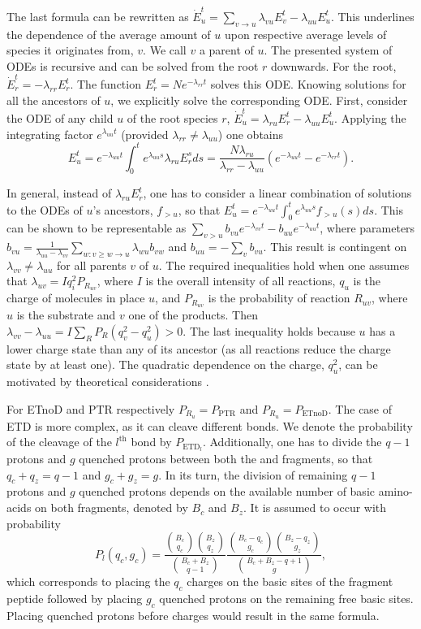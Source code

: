 \documentclass{llncs}
\begin{document}
The last formula can be rewritten as $ \dot E_u^t = \sum_{v\rightarrow u} \lambda_{vu} E_v^t - \lambda_{uu}E_u^t$.
This underlines the dependence of the average amount of $u$ upon respective average levels of species it originates from, $v$.
We call $v$ a parent of $u$.
The presented system of ODEs is recursive and can be solved from the root $r$ downwards.
For the root, $\dot E_r^t=-\lambda_{rr} E_r^t$.
The function $E_r^t= Ne^{-\lambda_{rr}t}$ solves this ODE.
Knowing solutions for all the ancestors of $u$, we explicitly solve the corresponding ODE.
First, consider the ODE of any child $u$ of the root species $r$, $\dot E_u^t= \lambda_{ru} E_r^t-\lambda_{uu} E_u^t$.
Applying the integrating factor $e^{\lambda_{uu}t}$ (provided $\lambda_{rr} \not= \lambda_{uu}$) one obtains
$$E_u^t=e^{-\lambda_{uu}t} \int_0^t e^{\lambda_{uu}s} \lambda_{ru} E_r^s ds = \frac{N \lambda_{ru}}{\lambda_{rr}-\lambda_{uu}}(e^{-\lambda_{uu}t}-e^{-\lambda_{rr}t}).$$

In general, instead of $\lambda_{ru} E_r^t$, one has to consider a linear combination of solutions to the ODEs of $u$'s ancestors, $f_{>u}$, so that $E_u^t=e^{-\lambda_{uu}t} \int_0^t e^{\lambda_{uu}s} f_{>u}(s)ds$.
This can be shown to be representable as $\sum_{v>u}b_{vu}e^{-\lambda_{vv}t}-b_{uu}e^{-\lambda_{uu}t}$, where parameters $b_{vu}= \frac{1}{\lambda_{uu}-\lambda_{vv}} \sum_{w: v\geq w \rightarrow u} \lambda_{wu}b_{vw}$ and $b_{uu}=-\sum_v b_{vu}$.
This result is contingent on $\lambda_{vv} \not= \lambda_{uu}$ for all parents $v$ of $u$.
The required inequalities hold when one assumes that $\lambda_{uv} = I q_i^2 P_{R_{uv}}$, where $I$ is the overall intensity of all reactions, $q_u$ is the charge of molecules in place $u$, and $P_{R_{uv}}$ is the probability of reaction $R_{uv}$, where $u$ is the substrate and $v$ one of the products. Then $\lambda_{vv} - \lambda_{uu} = I \sum_{R} P_R (q_v^2  - q_u^2) > 0.$
The last inequality holds because $u$ has a lower charge state than any of its ancestor
(as all reactions reduce the charge state by at least one).
The quadratic dependence on the charge, $q_u^2$, can be motivated by theoretical considerations \cite{McLuckey1999-su}.

For ETnoD and PTR respectively $P_{R_u}=P_\text{PTR}$ and $P_{R_u}=P_\text{ETnoD}$.
The case of ETD is more complex, as it can cleave different bonds.
We denote the probability of the cleavage of the $l^\text{th}$ bond by $P_{\text{ETD}_l}$.
Additionally, one has to divide the $q-1$ protons and $g$ quenched protons between both the  and  fragments, so that $q_c+q_z=q-1$ and $g_c+g_z = g$.
In its turn, the division of remaining $q-1$ protons and $g$ quenched protons depends on the available number of basic amino-acids on both fragments, denoted by $B_c$ and $B_z$.
It is assumed to occur with probability
$$P_l(q_c, g_c) = \frac{ \binom{B_c}{q_c}\binom{B_z}{q_z} }{ \binom{B_c+B_z}{q-1} } \frac{ \binom{B_c - q_c}{g_c} \binom{B_z-q_z}{g_z} }{ \binom{B_c+B_z-q+1}{g} },$$
which corresponds to placing the $q_c$ charges on the basic sites of the fragment peptide followed by placing $g_c$ quenched protons on the remaining free basic sites. Placing quenched protons before charges would result in the same formula.
\end{document}
